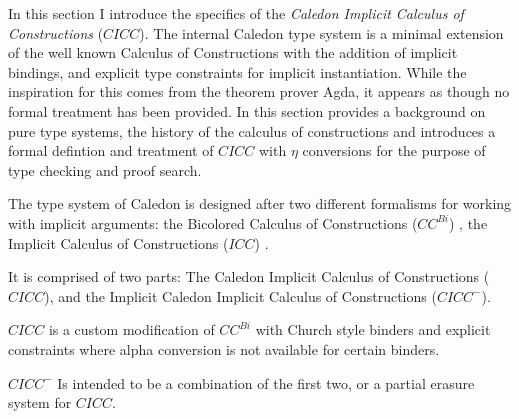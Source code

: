 In this section I introduce the specifics of the \textit{Caledon Implicit Calculus of Constructions} ($CICC$).
The internal Caledon type system is a minimal extension of the well known Calculus of Constructions with the 
addition of implicit bindings, and explicit type constraints for implicit instantiation.  
While the inspiration for this comes from the theorem prover Agda, it appears as though no formal treatment
has been provided. In this section provides a background on pure type systems, the history of the calculus of constructions
and introduces a formal defintion and treatment of $CICC$ with $\eta$ conversions for the purpose of type checking
and proof search.

The type system of Caledon is designed after two different formalisms for working with implicit arguments:  
the Bicolored Calculus of Constructions ($CC^{Bi}$) \citep{luther2001more}, 
the Implicit Calculus of Constructions ($ICC$) \citep{miquel2001implicit}.

It is comprised of two parts: The Caledon Implicit Calculus of Constructions ($CICC$), 
and the Implicit Caledon Implicit Calculus of Constructions ($CICC^-$).

$CICC$ is a custom modification of $CC^{Bi}$ with Church style binders and explicit constraints 
where alpha conversion is not available for certain binders.

$CICC^-$ Is intended to be a combination of the first two, or a partial 
erasure system for $CICC$. 
